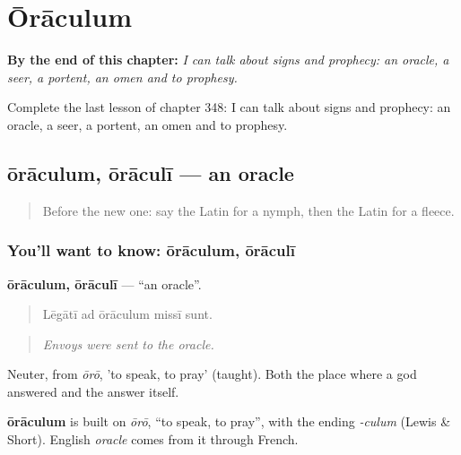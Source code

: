 
\chapter{Ōrāculum}
\label{ch:la-oraculum}

\begin{chapteropening}
\textbf{By the end of this chapter:} \emph{I can talk about signs and prophecy: an oracle, a seer, a portent, an omen and to prophesy.}

Complete the last lesson of chapter 348: I can talk about signs and prophecy: an oracle, a seer, a portent, an omen and to prophesy.
\end{chapteropening}

\section[ōrāculum, ōrāculī]{ōrāculum, ōrāculī — an oracle}

\label{lesson:LA-C348-oraculum}



\begin{quote}
Before the new one: say the Latin for a nymph, then the Latin for a fleece.
\end{quote}

\subsection*{You'll want to know: ōrāculum, ōrāculī}
\textbf{ōrāculum, ōrāculī} — \textquotedblleft{}an oracle\textquotedblright{}.

\begin{quote}
Lēgātī ad ōrāculum missī sunt.
\end{quote}

\begin{quote}
\emph{Envoys were sent to the oracle.}
\end{quote}

Neuter, from \emph{ōrō}, 'to speak, to pray' (taught). Both the place where a god answered and the answer itself.

\begin{cousinweb}
\textbf{ōrāculum} is built on \emph{ōrō}, \textquotedblleft{}to speak, to pray\textquotedblright{}, with the ending \emph{-culum} (Lewis \& Short). English \emph{oracle} comes from it through French.
\end{cousinweb}

